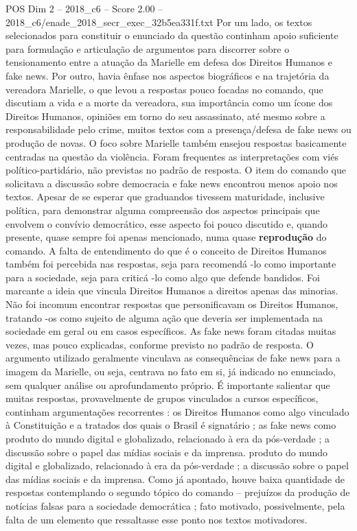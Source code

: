 \begin{textsample}{POS Dim 2 – 2018\_c6 – Score 2.00 – 2018\_c6/enade\_2018\_secr\_exec\_32b5ea331f.txt}
Por um lado, os textos selecionados para constituir o enunciado da questão continham apoio suficiente para formulação e articulação de argumentos para discorrer sobre o tensionamento entre a atuação da Marielle em defesa dos Direitos Humanos e fake news.
Por outro, havia ênfase nos aspectos biográficos e na trajetória da vereadora Marielle, o que levou a respostas pouco focadas no comando, que discutiam a vida e a morte da vereadora, sua importância como um ícone dos Direitos Humanos, opiniões em torno do seu assassinato, até mesmo sobre a responsabilidade pelo crime, muitos textos com a presença/defesa de fake news ou produção de novas.
O foco sobre Marielle também ensejou respostas basicamente centradas na questão da violência.
Foram frequentes as interpretações com viés político-partidário, não previstas no padrão de resposta.
O item do comando que solicitava a discussão sobre democracia e fake news encontrou menos apoio nos textos.
Apesar de se esperar que graduandos tivessem maturidade, inclusive política, para demonstrar alguma compreensão dos aspectos principais que envolvem o convívio democrático, esse aspecto foi pouco discutido e, quando presente, quase sempre foi apenas mencionado, numa quase \textbf{reprodução} do comando.
A falta de entendimento do que é o conceito de Direitos Humanos também foi percebida nas respostas, seja para recomendá -lo como importante para a sociedade, seja para criticá -lo como algo que defende bandidos.
Foi marcante a ideia que vincula Direitos Humanos a direitos apenas das minorias.
Não foi incomum encontrar respostas que personificavam os Direitos Humanos, tratando -os como sujeito de alguma ação que deveria ser implementada na sociedade em geral ou em casos específicos.
As fake news foram citadas muitas vezes, mas pouco explicadas, conforme previsto no padrão de resposta.
O argumento utilizado geralmente vinculava as consequências de fake news para a imagem da Marielle, ou seja, centrava no fato em si, já indicado no enunciado, sem qualquer análise ou aprofundamento próprio.
É importante salientar que muitas respostas, provavelmente de grupos vinculados a cursos específicos, continham argumentações recorrentes : os Direitos Humanos como algo vinculado à Constituição e a tratados dos quais o Brasil é signatário ; as fake news como produto do mundo digital e globalizado, relacionado à era da pós-verdade ; a discussão sobre o papel das mídias sociais e da imprensa. produto do mundo digital e globalizado, relacionado à era da pós-verdade ; a discussão sobre o papel das mídias sociais e da imprensa.
Como já apontado, houve baixa quantidade de respostas contemplando o segundo tópico do comando – prejuízos da produção de notícias falsas para a sociedade democrática ; fato motivado, possivelmente, pela falta de um elemento que ressaltasse esse ponto nos textos motivadores.

\end{textsample}

